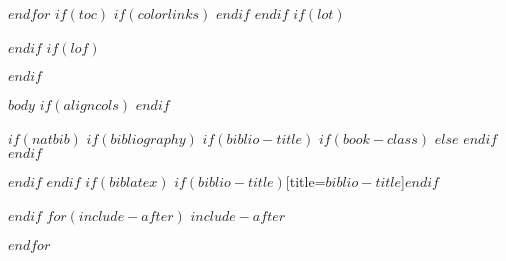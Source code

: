 \documentclass[10pt,a4paper,onecolumn]{article}
\begin{document}
$endfor$
$if(toc)$
{
$if(colorlinks)$
\hypersetup{linkcolor=$if(toccolor)$$toccolor$$else$black$endif$}
$endif$
\setcounter{tocdepth}{$toc-depth$}
\tableofcontents
}
$endif$
$if(lot)$
\listoftables
$endif$
$if(lof)$
\listoffigures
$endif$
\twocolumn

$body$
$if(aligncols)$
\balance
$endif$
\clearpage


$if(natbib)$
$if(bibliography)$
$if(biblio-title)$
$if(book-class)$
\renewcommand\bibname{$biblio-title$}
$else$
\renewcommand\refname{$biblio-title$}
$endif$
$endif$


$endif$
$endif$
$if(biblatex)$
\printbibliography$if(biblio-title)$[title=$biblio-title$]$endif$

$endif$
$for(include-after)$
$include-after$

$endfor$
\end{document}

